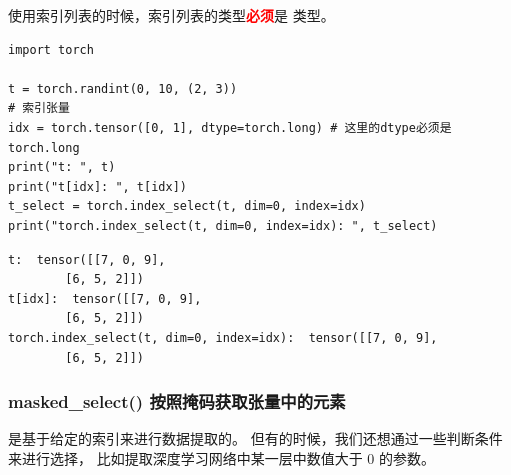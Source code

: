 使用索引列表的时候，索引列表的类型\textcolor{red}{\textbf{必须}}是  类型。

\begin{lstlisting}[style=pythonstyle]
import torch

t = torch.randint(0, 10, (2, 3))
# 索引张量
idx = torch.tensor([0, 1], dtype=torch.long) # 这里的dtype必须是torch.long
print("t: ", t)
print("t[idx]: ", t[idx])
t_select = torch.index_select(t, dim=0, index=idx)
print("torch.index_select(t, dim=0, index=idx): ", t_select)        
\end{lstlisting}
\begin{lstlisting}[style=demostyle,numbers=none]
t:  tensor([[7, 0, 9],
        [6, 5, 2]])
t[idx]:  tensor([[7, 0, 9],
        [6, 5, 2]])
torch.index_select(t, dim=0, index=idx):  tensor([[7, 0, 9],
        [6, 5, 2]])
\end{lstlisting}        
    
\subsubsection{masked\_select() 按照掩码获取张量中的元素}
\label{subsubsec:Pytorch-masked_select}
是基于给定的索引来进行数据提取的。
但有的时候，我们还想通过一些判断条件来进行选择，
比如提取深度学习网络中某一层中数值大于 0 的参数。

